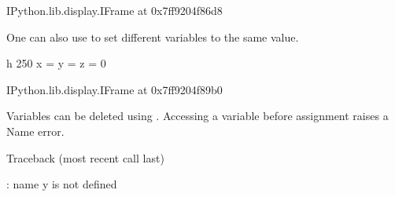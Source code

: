 \documentclass[letterpaper,10pt,english]{sphinxmanual}
\begin{document}
\begin{sphinxVerbatim}[commandchars=\\\{\}]
\PYGZlt{}IPython.lib.display.IFrame at 0x7ff9204f86d8\PYGZgt{}
\end{sphinxVerbatim}

One can also use  to set different variables to the same value.

\begin{sphinxVerbatim}[commandchars=\\\{\}]
 \PYGZhy{}h 250
x = y = z = 0
\end{sphinxVerbatim}

\begin{sphinxVerbatim}[commandchars=\\\{\}]
\PYGZlt{}IPython.lib.display.IFrame at 0x7ff9204f89b0\PYGZgt{}
\end{sphinxVerbatim}

Variables can be deleted using . Accessing a variable before assignment raises a Name error.

\begin{sphinxVerbatim}[commandchars=\\\{\}]
  
 
\end{sphinxVerbatim}

\begin{sphinxVerbatim}[commandchars=\\\{\}]
Traceback (most recent call last)
  
   
  

: name \PYGZsq{}y\PYGZsq{} is not defined
\end{sphinxVerbatim}
\end{document}
